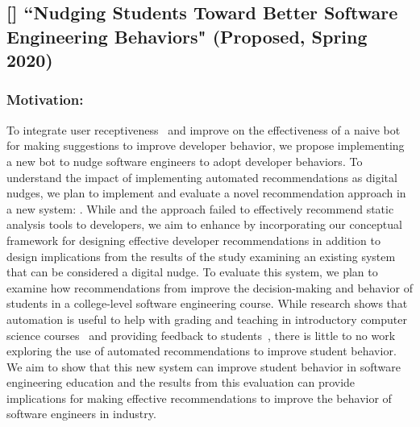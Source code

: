 \subsection{[\nudgeT] ``Nudging Students Toward Better Software Engineering Behaviors" (Proposed, Spring 2020)}

\subsubsection{Motivation:}

To integrate user receptiveness~\cite{VLHCC} and improve on the effectiveness of a naive bot~\cite{BotSE} for making suggestions to improve developer behavior, we propose implementing a new bot to nudge software engineers to adopt developer behaviors. To understand the impact of implementing automated recommendations as digital nudges, we plan to implement and evaluate a novel recommendation approach in a new system: \TOOL. While \tool and the \tele approach failed to effectively recommend static analysis tools to developers, we aim to enhance \TOOL by incorporating our conceptual framework for designing effective developer recommendations in addition to design implications from the results of the \sugg study examining an existing system that can be considered a digital nudge. To evaluate this system, we plan to examine how recommendations from \TOOL improve the decision-making and behavior of students in a college-level software engineering course. While research shows that automation is useful to help with grading and teaching in introductory computer science courses~\cite{singh2013automated} and providing feedback to students~\cite{hu2019feedback}, there is little to no work exploring the use of automated recommendations to improve student behavior. We aim to show that this new system can improve student behavior in software engineering education and the results from this evaluation can provide implications for making effective recommendations to improve the behavior of software engineers in industry.

